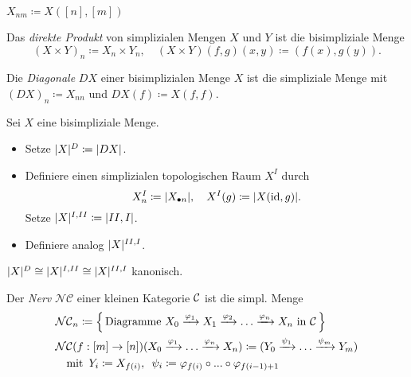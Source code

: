 \documentclass{cheat-sheet}
\newcommand{\NCat}{\mathcal{NC}} %
\begin{document}
\begin{nota}
  $X_{nm} \coloneqq X([n],[m])$
\end{nota}

\begin{bsp}
  Das \emph{direkte Produkt} von simplizialen Mengen $X$ und $Y$ ist die bisimpliziale Menge
  \[
    (X \times Y)_n \coloneqq X_n \times Y_n, \quad
    (X \times Y)(f, g)(x, y) \coloneqq (f(x), g(y)).
  \]
\end{bsp}

\begin{defn}
  Die \emph{Diagonale} $DX$ einer bisimplizialen Menge $X$ ist die simpliziale Menge mit
  $(DX)_n \coloneqq X_{nn}$ und $DX(f) \coloneqq X(f, f)$.
\end{defn}

\begin{defn}
  Sei $X$ eine bisimpliziale Menge.
  \begin{itemize}
    \item Setze $\lvert X\rvert^D \coloneqq \lvert DX\rvert$.
    \item Definiere einen simplizialen topologischen Raum $X^I$ durch
    \[ X^I_n \coloneqq \lvert X_{\bullet n}\rvert, \quad X^I(g) \coloneqq \lvert X(\operatorname{id}, g)\rvert. \]
    Setze $\lvert X\rvert^{I,II} \coloneqq \lvert II,I\rvert$.
    \item Definiere analog $\lvert X\rvert^{II,I}$.
  \end{itemize}
\end{defn}

\begin{satz}
  $\lvert X\rvert^D \cong \lvert X\rvert^{I,II} \cong \lvert X\rvert^{II,I}$ kanonisch.
\end{satz}

\begin{defn}
  Der \emph{Nerv} $\NCat$ einer kleinen Kategorie $\mathcal{C}$ ist die simpl. Menge
  \begin{align*}
    & \NCat_n \coloneqq \left\{ \, \text{Diagramme } X_0 \xrightarrow{\varphi_1} X_1 \xrightarrow{\varphi_2} \ldots \xrightarrow{\varphi_n} X_n \text{ in $\Cat$} \, \right\} \\
    & \NCat(f : [m] \to [n])(X_0 \xrightarrow{\varphi_1} \ldots \xrightarrow{\varphi_n} X_n) \coloneqq 
    ( Y_0 \xrightarrow{\psi_1} \ldots \xrightarrow{\psi_m} Y_m) \\
    & \quad \text{mit} \enspace Y_i \coloneqq X_{f(i)}, \enspace \psi_i \coloneqq \varphi_{f(i)} \circ \nldots \circ \varphi_{f(i-1)+1}
  \end{align*}
\end{defn}
\end{document}
